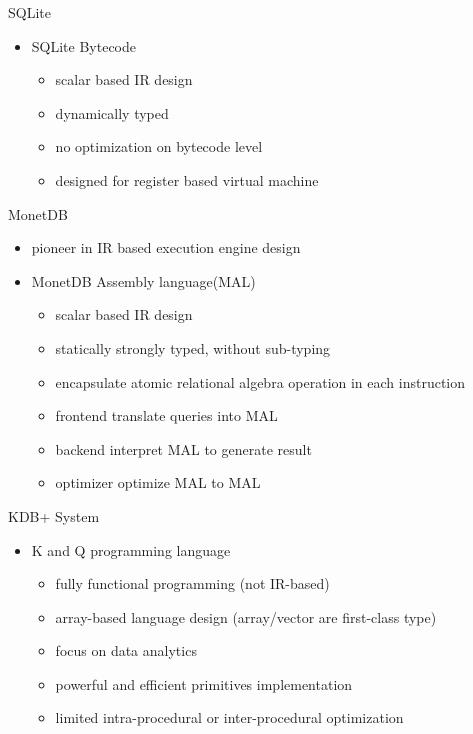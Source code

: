 \documentclass{beamer}
\begin{document}
\begin{frame}{SQLite}
\begin{itemize}
\item SQLite Bytecode
      \begin{itemize}
      \item scalar based IR design
      \item dynamically typed
      \item no optimization on bytecode level
      \item designed for register based virtual machine
      \end{itemize}
\end{itemize}
\end{frame}

\begin{frame}[fragile]{MonetDB}
\begin{itemize}
    \item pioneer in IR based execution engine design
    \item MonetDB Assembly language(MAL)
          \begin{itemize}
          \item scalar based IR design
          \item statically strongly typed, without sub-typing 
          \item encapsulate atomic relational algebra operation in each
                instruction
          \item frontend translate queries into MAL
          \item backend interpret MAL to generate result
          \item optimizer optimize MAL to MAL
          \end{itemize}
\end{itemize}
\end{frame}

\begin{frame}{KDB+ System}
\begin{itemize}
    \item K and Q programming language
          \begin{itemize}
          \item fully functional programming (not IR-based)
          \item array-based language design (array/vector are first-class type)
          \item focus on data analytics
          \item powerful and efficient primitives implementation
          \item limited intra-procedural or inter-procedural optimization
          \end{itemize}
\end{itemize}
\end{frame}
\end{document}
